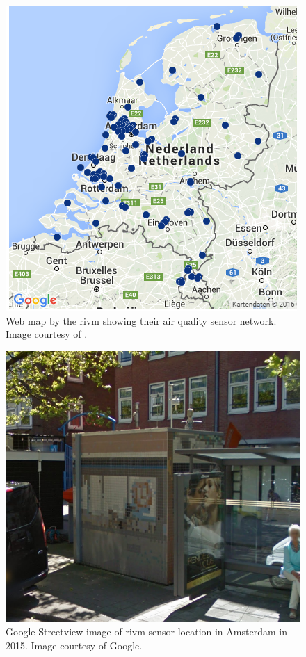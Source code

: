 \begin{figure}
	\centering
	\includegraphics[width=0.8\linewidth]{figs/RIVMSensors.png}
	\caption{Web map by the \acf*{rivm} showing their air quality sensor network. Image courtesy of \cite{DATA:RIVM}.}
	\label{fig:RIVMSensor}
\end{figure}

\begin{figure}
	\centering
	\includegraphics[width=0.8\linewidth]{figs/SensorAdam.png}
	\caption{Google Streetview image of \acs*{rivm} sensor location in Amsterdam in 2015. Image courtesy of Google.}
	\label{fig:Sensor}
\end{figure}


